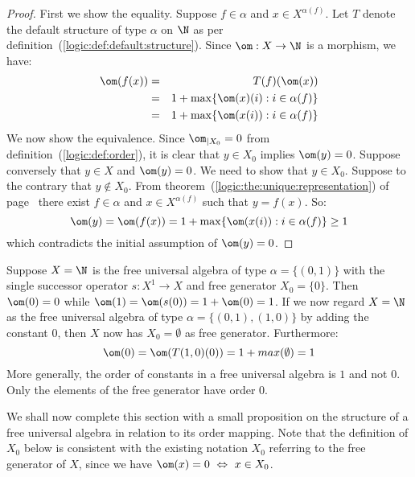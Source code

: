 \begin{proof}
First we show the equality. Suppose $f\in\alpha$ and $x\in
X^{\alpha(f)}$. Let $T$ denote the default structure of type
$\alpha$ on $\N$ as per
definition~(\ref{logic:def:default:structure}). Since $\om:X\to\N$
is a morphism, we have:
    \begin{eqnarray*}
    \om(f(x))&=&T(f)(\om(x))\\
    &=&1+\max\{\om(x)(i):i\in\alpha(f)\}\\
    &=&1+\max\{\om(x(i)):i\in\alpha(f)\}
    \end{eqnarray*}
We now show the equivalence. Since $\om_{|X_{0}}=0$ from
definition~(\ref{logic:def:order}), it is clear that $y\in X_{0}$
implies $\om(y)=0$. Suppose conversely that $y\in X$ and $\om(y)=0$.
We need to show that $y\in X_{0}$. Suppose to the contrary that
$y\not\in X_{0}$. From
theorem~(\ref{logic:the:unique:representation}) of
page~\pageref{logic:the:unique:representation} there exist
$f\in\alpha$ and $x\in X^{\alpha(f)}$ such that $y=f(x)$. So:
    \[
    \om(y)=\om(f(x))=1+\max\{\om(x(i)):i\in\alpha(f)\}\geq 1
    \]
which contradicts the initial assumption of $\om(y)=0$.
\end{proof}

Suppose $X=\N$ is the free universal algebra of type
$\alpha=\{(0,1)\}$ with the single successor operator $s:X^{1}\to X$
and free generator $X_{0}=\{0\}$. Then $\om(0)=0$ while
$\om(1)=\om(s(0))=1+\om(0)=1$. If we now regard $X=\N$ as the free
universal algebra of type $\alpha=\{(0,1),(1,0)\}$ by adding the
constant $0$, then $X$ now has $X_{0}=\emptyset$ as free generator.
Furthermore:
    \[
    \om(0)=\om(T(1,0)(0))=1+max(\emptyset)=1
    \]
More generally, the order of constants in a free universal algebra
is $1$ and not $0$. Only the elements of the free generator have
order $0$.

We shall now complete this section with a small proposition on the
structure of a free universal algebra in relation to its order
mapping. Note that the definition of $X_{0}$ below is consistent
with the existing notation $X_{0}$ referring to the free generator
of $X$, since we have $\om(x)=0\ \Leftrightarrow\ x\in X_{0}$.

